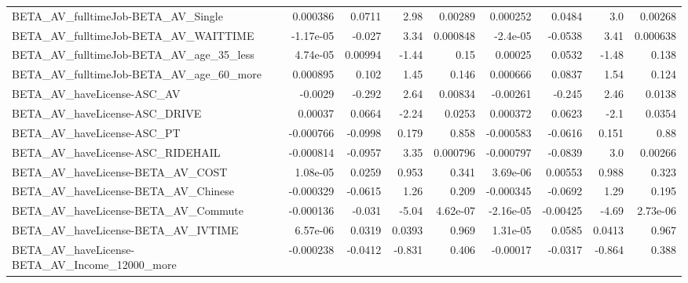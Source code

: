 \begin{tabular}{lrrrrrrrr}
BETA\_AV\_fulltimeJob-BETA\_AV\_Single                 &    0.000386 &       0.0711 &      2.98 &  0.00289 &   0.000252 &      0.0484 &          3.0 &       0.00268 \\
BETA\_AV\_fulltimeJob-BETA\_AV\_WAITTIME               &   -1.17e-05 &       -0.027 &      3.34 & 0.000848 &   -2.4e-05 &     -0.0538 &         3.41 &      0.000638 \\
BETA\_AV\_fulltimeJob-BETA\_AV\_age\_35\_less            &    4.74e-05 &      0.00994 &     -1.44 &     0.15 &    0.00025 &      0.0532 &        -1.48 &         0.138 \\
BETA\_AV\_fulltimeJob-BETA\_AV\_age\_60\_more            &    0.000895 &        0.102 &      1.45 &    0.146 &   0.000666 &      0.0837 &         1.54 &         0.124 \\
BETA\_AV\_haveLicense-ASC\_AV                         &     -0.0029 &       -0.292 &      2.64 &  0.00834 &   -0.00261 &      -0.245 &         2.46 &        0.0138 \\
BETA\_AV\_haveLicense-ASC\_DRIVE                      &     0.00037 &       0.0664 &     -2.24 &   0.0253 &   0.000372 &      0.0623 &         -2.1 &        0.0354 \\
BETA\_AV\_haveLicense-ASC\_PT                         &   -0.000766 &      -0.0998 &     0.179 &    0.858 &  -0.000583 &     -0.0616 &        0.151 &          0.88 \\
BETA\_AV\_haveLicense-ASC\_RIDEHAIL                   &   -0.000814 &      -0.0957 &      3.35 & 0.000796 &  -0.000797 &     -0.0839 &          3.0 &       0.00266 \\
BETA\_AV\_haveLicense-BETA\_AV\_COST                   &    1.08e-05 &       0.0259 &     0.953 &    0.341 &   3.69e-06 &     0.00553 &        0.988 &         0.323 \\
BETA\_AV\_haveLicense-BETA\_AV\_Chinese                &   -0.000329 &      -0.0615 &      1.26 &    0.209 &  -0.000345 &     -0.0692 &         1.29 &         0.195 \\
BETA\_AV\_haveLicense-BETA\_AV\_Commute                &   -0.000136 &       -0.031 &     -5.04 & 4.62e-07 &  -2.16e-05 &    -0.00425 &        -4.69 &      2.73e-06 \\
BETA\_AV\_haveLicense-BETA\_AV\_IVTIME                 &    6.57e-06 &       0.0319 &    0.0393 &    0.969 &   1.31e-05 &      0.0585 &       0.0413 &         0.967 \\
BETA\_AV\_haveLicense-BETA\_AV\_Income\_12000\_more      &   -0.000238 &      -0.0412 &    -0.831 &    0.406 &   -0.00017 &     -0.0317 &       -0.864 &         0.388 \\

\end{tabular}
